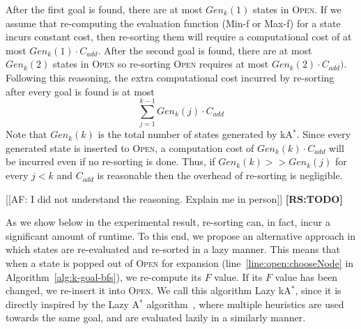 \documentclass{aicom2e}
\newcommand{\astar}{A$^*$}
\newcommand{\kastar}{kA$^*$}
\newcommand{\minf}{Min-f}
\newcommand{\maxf}{Max-f}
\newcommand{\open}{\textsc{Open}}
\newcommand{\roni}[1]{\textbf{[RS:#1]}}
\begin{document}

After the first goal is found, there are at most $Gen_k(1)$ states in \open{}. If we assume that re-computing the evaluation function (\minf{} or \maxf{}) for a state incurs constant cost, then re-sorting them will require a computational cost of at most $Gen_k(1)\cdot C_{add}$. After the second goal is found, there are at most $Gen_k(2)$ states in \open{} so re-sorting \open{} requires at most $Gen_k(2)\cdot C_{add})$. Following this reasoning, the extra computational cost incurred by re-sorting after every goal is found is at most  
\begin{equation}  
\sum_{j=1}^{k-1} Gen_k(j)\cdot C_{add}
\label{eq:re-sort-cost}
\end{equation}
Note that $Gen_k(k)$ is the total number of states generated by \kastar{}.
Since every generated state is inserted to \open{}, a computation cost of
$Gen_k(k)\cdot C_{add}$ will be incurred even if no re-sorting is done. Thus,
if $Gen_k(k)>>Gen_k(j)$ for every $j<k$ and $C_{add}$ is reasonable then the overhead of re-sorting is negligible.

[[AF: I did not understand the reasoning. Explain me in person]]
\roni{TODO}

As we show below in the experimental result, re-sorting can, in fact, incur a significant amount of runtime. To this end, we propose an alternative approach in which states are re-evaluated and re-sorted in a lazy manner. This means that when a state is popped out of \open{} for expansion (line~\ref{line:open:chooseNode} in Algorithm~\ref{alg:k-goal-bfs}), we re-compute its $F$ value. If its $F$ value has been changed, we re-insert it into \open{}. 
We call this algorithm Lazy \kastar{}, since it is directly inspired by the Lazy \astar{} algorithm~\cite{betzalel2015typeSystem,tolpin2013toward}, where multiple heuristics are used towards the same goal, and are evaluated lazily in a similarly manner.  
\end{document}
